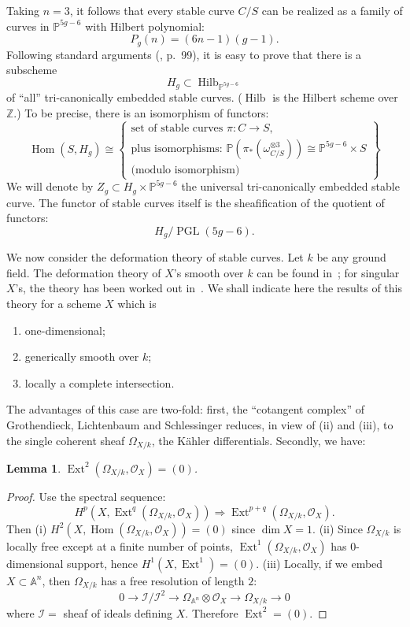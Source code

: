 \documentclass[10pt]{amsart}
\theoremstyle{plain}
\newtheorem{lemma}[theorem]{Lemma}
\theoremstyle{definition}
\DeclareMathOperator{\Ext}{Ext}
\DeclareMathOperator{\Hom}{Hom}
\DeclareMathOperator{\PGL}{PGL}
\DeclareMathOperator{\Hilb}{Hilb}
\newcommand{\cO}{\mathcal{O}}
\begin{document}
Taking $n=3$, it follows that every stable curve $C/S$ can be realized as a family of curves in $\mathbb{P}^{5g-6}$ with Hilbert polynomial:
\[
P_g(n) = (6n-1)(g-1).
\]
Following standard arguments (\cite{M1}, p.~99), it is easy to prove that there is a subscheme
\[
H_g \subset \Hilb_{\mathbb{P}^{5g-6}}
\]
of ``all'' tri-canonically embedded stable curves. ($\Hilb$ is the Hilbert scheme over $\mathbb{Z}$.) To be precise, there is an isomorphism of functors:
\[
\Hom(S, H_g) \cong \left\{ \begin{array}{c} \text{set of stable curves } \pi: C \to S, \\ \text{plus isomorphisms: } \mathbb{P}(\pi_*(\omega_{C/S}^{\otimes 3})) \cong \mathbb{P}^{5g-6} \times S \\ \text{(modulo isomorphism)} \end{array} \right\}
\]
We will denote by $Z_g \subset H_g \times \mathbb{P}^{5g-6}$ the universal tri-canonically embedded stable curve. The functor of stable curves itself is the sheafification of the quotient of functors:
\[
H_g / \PGL(5g-6).
\]

We now consider the deformation theory of stable curves. Let $k$ be any ground field. The deformation theory of $X$'s smooth over $k$ can be found in~\cite{SGA}; for singular $X$'s, the theory has been worked out in~\cite{Sc}. We shall indicate here the results of this theory for a scheme $X$ which is
\begin{enumerate}
\item[(i)] one-dimensional;
\item[(ii)] generically smooth over $k$;
\item[(iii)] locally a complete intersection.
\end{enumerate}
The advantages of this case are two-fold: first, the ``cotangent complex'' of Grothendieck, Lichtenbaum and Schlessinger reduces, in view of (ii) and (iii), to the single coherent sheaf $\Omega_{X/k}$, the K\"ahler differentials. Secondly, we have:

\begin{lemma}\label{lem:1.3}
$\Ext^2(\Omega_{X/k}, \cO_X) = (0)$.
\end{lemma}

\begin{proof}
Use the spectral sequence:
\[
H^p(X, \Ext^q(\Omega_{X/k}, \cO_X)) \Rightarrow \Ext^{p+q}(\Omega_{X/k}, \cO_X).
\]
Then (i) $H^2(X, \Hom(\Omega_{X/k}, \cO_X)) = (0)$ since $\dim X = 1$. (ii) Since $\Omega_{X/k}$ is locally free except at a finite number of points, $\Ext^1(\Omega_{X/k}, \cO_X)$ has $0$-dimensional support, hence $H^1(X, \Ext^1) = (0)$. (iii) Locally, if we embed $X \subset \mathbb{A}^n$, then $\Omega_{X/k}$ has a free resolution of length $2$:
\[
0 \longrightarrow \mathscr{I}/\mathscr{I}^2 \longrightarrow \Omega_{\mathbb{A}^n} \otimes \cO_X \longrightarrow \Omega_{X/k} \longrightarrow 0
\]
where $\mathscr{I} =$ sheaf of ideals defining $X$. Therefore $\Ext^2 = (0)$.
\end{proof}
\end{document}
